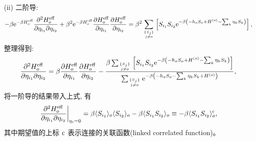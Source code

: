 (ii) 二阶导:
\begin{equation}
    -\beta\mathrm{e}^{-\beta H_{o}^{\mathrm{eff}}}\frac{\partial^2H_{o}^{\mathrm{eff}}}{\partial \eta_{i_1}\partial\eta_{i_2}}+\beta^2\mathrm{e}^{-\beta H_{o}^{\mathrm{eff}}}\frac{\partial H_{o}^{\mathrm{eff}}}{\partial\eta_{i_1}}\frac{\partial H_{o}^{\mathrm{eff}}}{\partial \eta_{i_2}}=\beta^2\sum_{\{S_j\}\atop j\ne o}\left[ S_{i_1}S_{i_2}\mathrm{e}^{-\beta\left( -h_o S_o+H^{(o)}-\sum_k \eta_k S_k \right)} \right],
\end{equation}
整理得到:
\begin{equation}
    \begin{aligned}
        \frac{\partial^2 H_{o}^{\mathrm{eff}}}{\partial\eta_{i_1}\partial\eta_{i_2}}=\beta\frac{\partial H_{o}^{\mathrm{eff}}}{\partial\eta_{i_1}}\frac{\partial H_{o}^{\mathrm{eff}}}{\partial\eta_{i_2}}-\frac{\beta\sum_{\{S_j\}\atop j\ne o}\left[ S_{i_1}S_{i_2}\mathrm{e}^{-\beta\left( -h_oS_o+H^{(o)}-\sum_k\eta_k S_k \right)} \right]}{\sum_{\{S_j\}\atop j\ne o}\mathrm{e}^{-\beta\left( -h_oS_o-\sum_k\eta_k S_k+H^{(o)} \right)}},
    \end{aligned}
\end{equation}
将一阶导的结果带入上式, 有
\begin{equation}
    \left.\frac{\partial^2H_{o}^{\mathrm{eff}}}{\partial\eta_{i_1}\partial \eta_{i_2}}\right|_{\eta_i=0}=\beta\langle S_{i_1} \rangle_o\langle S_{i_2} \rangle_o-\beta\langle S_{i_1}S_{i_2} \rangle_o\equiv -\beta\langle S_{i_1}S_{i_2} \rangle_o^{\mathrm{c}},
\end{equation}
其中期望值的上标 $\mathrm{c}$ 表示连接的关联函数(linked correlated function)。

